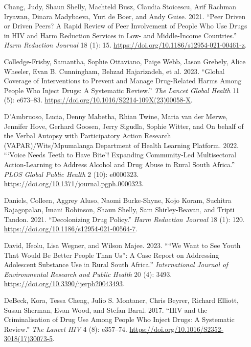 \documentclass[
  letterpaper,
  DIV=11,
  numbers=noendperiod]{scrartcl}
\newlength{\cslhangindent}
\newenvironment{CSLReferences}[2] %
 {\begin{list}{}{%
  \setlength{\itemindent}{0pt}
  \setlength{\leftmargin}{0pt}
  \setlength{\parsep}{0pt}
  \ifodd #1
   \setlength{\leftmargin}{\cslhangindent}
   \setlength{\itemindent}{-1\cslhangindent}
  \fi
  \setlength{\itemsep}{#2\baselineskip}}}
 {\end{list}}
\begin{document}
\begin{CSLReferences}{1}{0}
Chang, Judy, Shaun Shelly, Machteld Busz, Claudia Stoicescu, Arif
Rachman Iryawan, Dinara Madybaeva, Yuri de Boer, and Andy Guise. 2021.
{``Peer Driven or Driven Peers? A Rapid Review of Peer Involvement of
People Who Use Drugs in HIV and Harm Reduction Services in Low- and
Middle-Income Countries.''} \emph{Harm Reduction Journal} 18 (1): 15.
\url{https://doi.org/10.1186/s12954-021-00461-z}.

Colledge-Frisby, Samantha, Sophie Ottaviano, Paige Webb, Jason Grebely,
Alice Wheeler, Evan B. Cunningham, Behzad Hajarizadeh, et al. 2023.
{``Global Coverage of Interventions to Prevent and Manage Drug-Related
Harms Among People Who Inject Drugs: A Systematic Review.''} \emph{The
Lancet Global Health} 11 (5): e673--83.
\url{https://doi.org/10.1016/S2214-109X(23)00058-X}.

D'Ambruoso, Lucia, Denny Mabetha, Rhian Twine, Maria van der Merwe,
Jennifer Hove, Gerhard Goosen, Jerry Sigudla, Sophie Witter, and On
behalf of the Verbal Autopsy with Participatory Action Research
(VAPAR)/Wits/Mpumalanga Department of Health Learning Platform. 2022.
{``{`}Voice Needs Teeth to Have Bite{'}! Expanding Community-Led
Multisectoral Action-Learning to Address Alcohol and Drug Abuse in Rural
South Africa.''} \emph{PLOS Global Public Health} 2 (10): e0000323.
\url{https://doi.org/10.1371/journal.pgph.0000323}.

Daniels, Colleen, Aggrey Aluso, Naomi Burke-Shyne, Kojo Koram, Suchitra
Rajagopalan, Imani Robinson, Shaun Shelly, Sam Shirley-Beavan, and
Tripti Tandon. 2021. {``Decolonizing Drug Policy.''} \emph{Harm
Reduction Journal} 18 (1): 120.
\url{https://doi.org/10.1186/s12954-021-00564-7}.

David, Ifeolu, Lisa Wegner, and Wilson Majee. 2023. {``{``}We Want to
See Youth That Would Be Better People Than Us{''}: A Case Report on
Addressing Adolescent Substance Use in Rural South Africa.''}
\emph{International Journal of Environmental Research and Public Health}
20 (4): 3493. \url{https://doi.org/10.3390/ijerph20043493}.

DeBeck, Kora, Tessa Cheng, Julio S. Montaner, Chris Beyrer, Richard
Elliott, Susan Sherman, Evan Wood, and Stefan Baral. 2017. {``HIV and
the Criminalisation of Drug Use Among People Who Inject Drugs: A
Systematic Review.''} \emph{The Lancet HIV} 4 (8): e357--74.
\url{https://doi.org/10.1016/S2352-3018(17)30073-5}.


\end{CSLReferences}
\end{document}
